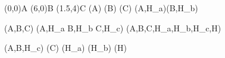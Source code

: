 \tkzDefPoint(0,0){A}
\tkzDefPoint(6,0){B}
\tkzDefPoint(1.5,4){C}
\tkzDefPointBy[projection=onto B--C](A) 
\tkzDefPointBy[projection=onto A--C](B) 
\tkzDefPointBy[projection=onto A--B](C) 
\tkzInterLL(A,H_a)(B,H_b) 

\tkzDrawPolygon(A,B,C)
\tkzDrawSegments(A,H_a B,H_b C,H_c)
\tkzDrawPoints(A,B,C,H_a,H_b,H_c,H)

\tkzLabelPoints[below](A,B,H_c)
\tkzLabelPoints[above](C)
(H_a)
(H_b)
\tkzLabelPoints[right](H)
